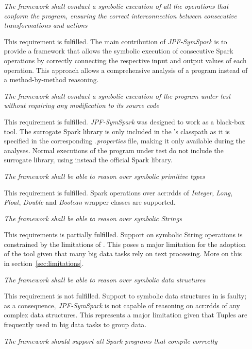 \begin{itemize}
 \textit{The framework shall conduct a symbolic execution of all the operations that conform the program, ensuring the correct interconnection between consecutive transformations and actions}

This requirement is fulfilled. The main contribution of \textit{JPF-SymSpark} is to provide a framework that allows the symbolic execution of consecutive Spark operations by correctly connecting the respective input and output values of each operation. This approach allows a comprehensive analysis of a program instead of a method-by-method reasoning.

 \textit{The framework shall conduct a symbolic execution of the program under test without requiring any modification to its source code}

This requirement is fulfilled. \textit{JPF-SymSpark} was designed to work as a black-box tool. The surrogate Spark library is only included in the \jpf{}'s classpath as it is specified in the corresponding \textit{.properties} file, making it only available during the analyses. Normal executions of the program under test do not include the surrogate library, using instead the official Spark library.

 \textit{The framework shall be able to reason over symbolic primitive types}

This requirement is fulfilled. Spark operations over \acrshort{acr:rdd}s of \textit{Integer}, \textit{Long}, \textit{Float}, \textit{Double} and \textit{Boolean} wrapper classes are supported.

 \textit{The framework shall be able to reason over symbolic Strings}

This requirements is partially fulfilled. Support on symbolic String operations is constrained by the limitations of \spf{}. This poses a major limitation for the adoption of the tool given that many big data tasks rely on text processing. More on this in section~\ref{sec:limitations}.

 \textit{The framework shall be able to reason over symbolic data structures}

This requirement is not fulfilled. Support to symbolic data structures in \spf{} is faulty; as a consequence, \textit{JPF-SymSpark} is not capable of reasoning on \acrshort{acr:rdd}s of any complex data structures. This represents a major limitation given that Tuples are frequently used in big data tasks to group data.

 \textit{The framework should support all Spark programs that compile correctly}


\end{itemize}
